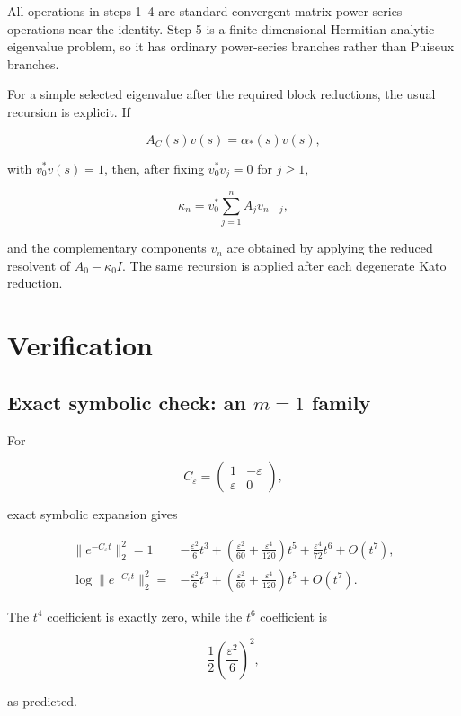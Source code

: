\documentclass[11pt,a4paper]{article}
\begin{document}
All operations in steps 1--4 are standard convergent matrix power-series operations near the identity. Step 5 is a finite-dimensional Hermitian analytic eigenvalue problem, so it has ordinary power-series branches rather than Puiseux branches.

For a simple selected eigenvalue after the required block reductions, the usual recursion is explicit. If

\[
A_C(s)v(s)=\alpha_*(s)v(s),
\]

with \(v_0^*v(s)=1\), then, after fixing \(v_0^*v_j=0\) for \(j\ge 1\),

\[
\kappa_n=v_0^*\sum_{j=1}^{n}A_jv_{n-j},
\]

and the complementary components \(v_n\) are obtained by applying the reduced resolvent of \(A_0-\kappa_0 I\). The same recursion is applied after each degenerate Kato reduction.

\section{Verification}\label{verification}

\subsection{\texorpdfstring{Exact symbolic check: an \(m=1\) family}{Exact symbolic check: an m=1 family}}\label{exact-symbolic-check-an-m1-family}

For

\[
C_\varepsilon=
\begin{pmatrix}
1&-\varepsilon\\
\varepsilon&0
\end{pmatrix},
\]

exact symbolic expansion gives

\[
\begin{aligned}
\|e^{-C_\varepsilon t}\|_2^2
=1&-\frac{\varepsilon^2}{6}t^3
 +\left(\frac{\varepsilon^2}{60}+\frac{\varepsilon^4}{120}\right)t^5
 +\frac{\varepsilon^4}{72}t^6+O(t^7),\\
\log\|e^{-C_\varepsilon t}\|_2^2
=&-\frac{\varepsilon^2}{6}t^3
 +\left(\frac{\varepsilon^2}{60}+\frac{\varepsilon^4}{120}\right)t^5
 +O(t^7).
\end{aligned}
\]

The \(t^4\) coefficient is exactly zero, while the \(t^6\) coefficient is

\[
\frac12\left(\frac{\varepsilon^2}{6}\right)^2,
\]

as predicted.
\end{document}
